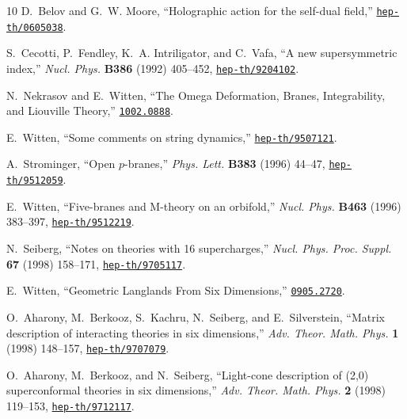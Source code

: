 \begin{thebibliography}{10}
D.~Belov and G.~W. Moore, ``{Holographic action for the self-dual field},''
\href{http://www.arXiv.org/abs/hep-th/0605038}{{\tt hep-th/0605038}}.

S.~Cecotti, P.~Fendley, K.~A. Intriligator, and C.~Vafa, ``A new supersymmetric
  index,'' {\em Nucl. Phys.} {\bf B386} (1992) 405--452,
\href{http://www.arXiv.org/abs/hep-th/9204102}{{\tt hep-th/9204102}}.

N.~Nekrasov and E.~Witten, ``{The Omega Deformation, Branes, Integrability, and
  Liouville Theory},''
\href{http://www.arXiv.org/abs/1002.0888}{{\tt 1002.0888}}.

E.~Witten, ``{Some comments on string dynamics},''
\href{http://www.arXiv.org/abs/hep-th/9507121}{{\tt hep-th/9507121}}.

A.~Strominger, ``Open {$p$}-branes,'' {\em Phys. Lett.} {\bf B383} (1996)
  44--47,
\href{http://arXiv.org/abs/hep-th/9512059}{{\tt hep-th/9512059}}.

E.~Witten, ``{Five-branes and M-theory on an orbifold},'' {\em Nucl. Phys.}
  {\bf B463} (1996) 383--397,
\href{http://www.arXiv.org/abs/hep-th/9512219}{{\tt hep-th/9512219}}.

N.~Seiberg, ``{Notes on theories with 16 supercharges},'' {\em Nucl. Phys.
  Proc. Suppl.} {\bf 67} (1998) 158--171,
\href{http://www.arXiv.org/abs/hep-th/9705117}{{\tt hep-th/9705117}}.

E.~Witten, ``{Geometric Langlands From Six Dimensions},''
\href{http://www.arXiv.org/abs/0905.2720}{{\tt 0905.2720}}.

O.~Aharony, M.~Berkooz, S.~Kachru, N.~Seiberg, and E.~Silverstein, ``{Matrix
  description of interacting theories in six dimensions},'' {\em Adv. Theor.
  Math. Phys.} {\bf 1} (1998) 148--157,
\href{http://www.arXiv.org/abs/hep-th/9707079}{{\tt hep-th/9707079}}.

O.~Aharony, M.~Berkooz, and N.~Seiberg, ``{Light-cone description of (2,0)
  superconformal theories in six dimensions},'' {\em Adv. Theor. Math. Phys.}
  {\bf 2} (1998) 119--153,
\href{http://www.arXiv.org/abs/hep-th/9712117}{{\tt hep-th/9712117}}.


\end{thebibliography}

